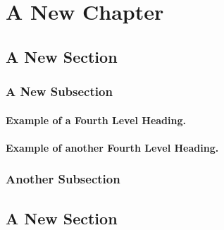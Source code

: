 \chapter{A New Chapter}
\section{A New Section}
\blindtext
\subsection{A New Subsection}
\blindtext
\subsubsection{Example of a Fourth Level Heading.} 
\blindtext
\subsubsection{Example of another Fourth Level Heading.} 
\blindtext

\subsection{Another Subsection}
\lipsum
\section{A New Section}
\lipsum
